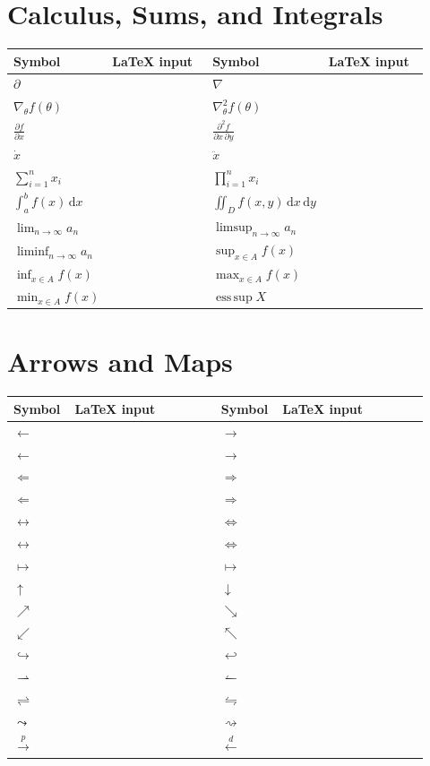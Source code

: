 \documentclass[10pt]{article}
\newcommand{\dd}{\,\mathrm{d}}
\newcommand{\code}[1]{\texttt{\detokenize{#1}}}
\newcommand{\srow}[4]{$#1$ & \code{#2} & $#3$ & \code{#4}\\}
\newenvironment{symtable}
{\small\begin{longtable}{
  >{\centering\arraybackslash}p{0.12\linewidth}
  >{\raggedright\arraybackslash}p{0.34\linewidth}
  >{\centering\arraybackslash}p{0.12\linewidth}
  >{\raggedright\arraybackslash}p{0.34\linewidth}}
  \toprule
  \textbf{Symbol} & \textbf{LaTeX input} &
  \textbf{Symbol} & \textbf{LaTeX input}\\
  \midrule
  \endhead}
{\bottomrule\end{longtable}}
\begin{document}
\section*{Calculus, Sums, and Integrals}

\begin{symtable}
\srow{\partial}{\partial}{\nabla}{\nabla}
\srow{\nabla_\theta f(\theta)}{\nabla_\theta f(\theta)}{\nabla^2_\theta f(\theta)}{\nabla^2_\theta f(\theta)}
\srow{\frac{\partial f}{\partial x}}{\frac{\partial f}{\partial x}}{\frac{\partial^2 f}{\partial x\,\partial y}}{\frac{\partial^2 f}{\partial x\,\partial y}}
\srow{\dot{x}}{\dot{x}}{\ddot{x}}{\ddot{x}}
\srow{\sum_{i=1}^n x_i}{\sum_{i=1}^n x_i}{\prod_{i=1}^n x_i}{\prod_{i=1}^n x_i}
\srow{\int_a^b f(x)\dd x}{\int_a^b f(x)\dd x}{\iint_D f(x,y)\dd x\dd y}{\iint_D f(x,y)\dd x\dd y}
\srow{\lim_{n\to\infty} a_n}{\lim_{n\to\infty} a_n}{\limsup_{n\to\infty} a_n}{\limsup_{n\to\infty} a_n}
\srow{\liminf_{n\to\infty} a_n}{\liminf_{n\to\infty} a_n}{\sup_{x\in A} f(x)}{\sup_{x\in A} f(x)}
\srow{\inf_{x\in A} f(x)}{\inf_{x\in A} f(x)}{\max_{x\in A} f(x)}{\max_{x\in A} f(x)}
\srow{\min_{x\in A} f(x)}{\min_{x\in A} f(x)}{\operatorname*{ess\,sup} X}{\operatorname*{ess\,sup} X}
\end{symtable}

\section*{Arrows and Maps}

\begin{symtable}
\srow{\leftarrow}{\leftarrow}{\rightarrow}{\rightarrow}
\srow{\longleftarrow}{\longleftarrow}{\longrightarrow}{\longrightarrow}
\srow{\Leftarrow}{\Leftarrow}{\Rightarrow}{\Rightarrow}
\srow{\Longleftarrow}{\Longleftarrow}{\Longrightarrow}{\Longrightarrow}
\srow{\leftrightarrow}{\leftrightarrow}{\Leftrightarrow}{\Leftrightarrow}
\srow{\longleftrightarrow}{\longleftrightarrow}{\Longleftrightarrow}{\Longleftrightarrow}
\srow{\mapsto}{\mapsto}{\longmapsto}{\longmapsto}
\srow{\uparrow}{\uparrow}{\downarrow}{\downarrow}
\srow{\nearrow}{\nearrow}{\searrow}{\searrow}
\srow{\swarrow}{\swarrow}{\nwarrow}{\nwarrow}
\srow{\hookrightarrow}{\hookrightarrow}{\hookleftarrow}{\hookleftarrow}
\srow{\rightharpoonup}{\rightharpoonup}{\leftharpoonup}{\leftharpoonup}
\srow{\rightleftharpoons}{\rightleftharpoons}{\leftrightharpoons}{\leftrightharpoons}
\srow{\leadsto}{\leadsto}{\rightsquigarrow}{\rightsquigarrow}
\srow{\xrightarrow{p}}{\xrightarrow{p}}{\xleftarrow{d}}{\xleftarrow{d}}
\end{symtable}
\end{document}
